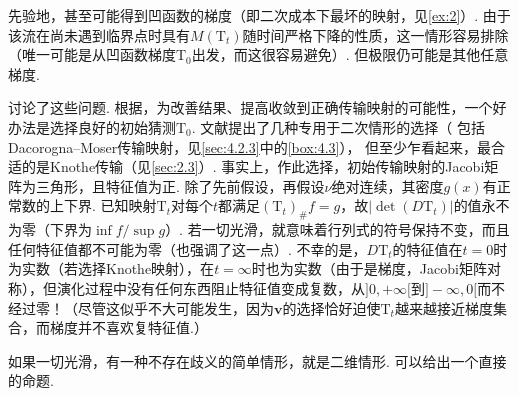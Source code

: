 先验地，甚至可能得到凹函数的梯度（即二次成本下最坏的映射，见\autoref{ex:2}）. 由于该流在尚未遇到临界点时具有$M(\mathrm T_t)$随时间严格下降的性质，这一情形容易排除（唯一可能是从凹函数梯度$\mathrm T_0$出发，而这很容易避免）. 但极限仍可能是其他任意梯度.

\cite{b86}讨论了这些问题. 根据\cite{b19,b20}，为改善结果、提高收敛到正确传输映射的可能性，一个好办法是选择良好的初始猜测$\mathrm T_0$. 文献提出了几种专用于二次情形的选择（\label{idx:i37-p230}
包括Dacorogna--Moser传输映射，见\autoref{sec:4.2.3}中的\autoref{box:4.3}），\label{idx:i86-p230}
但至少乍看起来，最合适的是Knothe传输（见\autoref{sec:2.3}）. 事实上，作此选择，初始传输映射的Jacobi矩阵为三角形，且特征值为正. 除了先前假设，再假设$\nu$绝对连续，其密度$g(x)$有正常数的上下界. 已知映射$\mathrm T_t$对每个$t$都满足$(\mathrm T_t)_\#f=g$，故$|\det(D\mathrm T_t)|$的值永不为零（下界为$\inf f/\sup g$）. 若一切光滑，就意味着行列式的符号保持不变，而且任何特征值都不可能为零（\cite{b86}也强调了这一点）. 不幸的是，$D\mathrm T_t$的特征值在$t=0$时为实数（若选择Knothe映射），在$t=\infty$时也为实数（由于是梯度，Jacobi矩阵对称），但演化过程中没有任何东西阻止特征值变成复数，从$]0,+\infty[$到$]-\infty,0[$而不经过零！（尽管这似乎不大可能发生，因为$\mathbf v$的选择恰好迫使$\mathrm T_t$越来越接近梯度集合，而梯度并不喜欢复特征值.）

如果一切光滑，有一种不存在歧义的简单情形，就是二维情形. 可以给出一个直接的命题.

